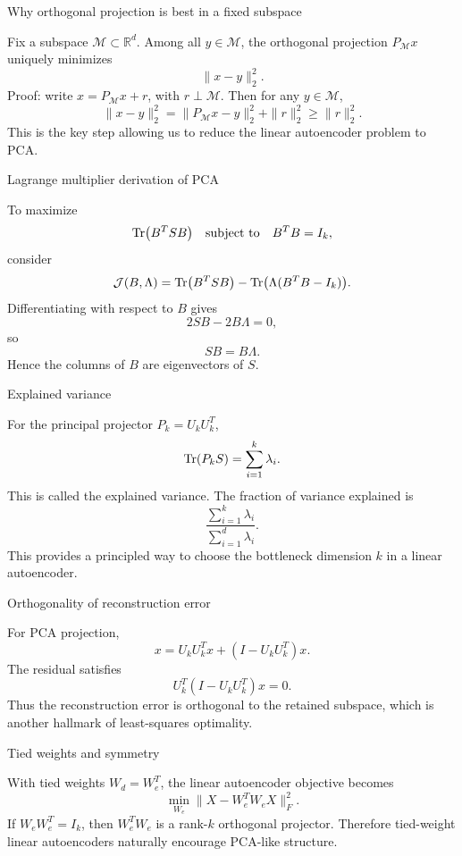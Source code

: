 \documentclass[aspectratio=169]{beamer}
\begin{document}
\begin{frame}{Why orthogonal projection is best in a fixed subspace}

Fix a subspace \(\mathcal{M}\subset \mathbb{R}^d\). Among all \(y\in \mathcal{M}\), the orthogonal projection \(P_{\mathcal{M}}x\) uniquely minimizes
\[
\|x-y\|_2^2.
\]
Proof: write \(x = P_{\mathcal{M}}x + r\), with \(r\perp \mathcal{M}\). Then for any \(y\in\mathcal{M}\),
\[
\|x-y\|_2^2
=
\|P_{\mathcal{M}}x-y\|_2^2 + \|r\|_2^2 \ge \|r\|_2^2.
\]
This is the key step allowing us to reduce the linear autoencoder problem to PCA.

\end{frame}

\begin{frame}{Lagrange multiplier derivation of PCA}

To maximize
\[
\Tr(B^TSB)
\quad \text{subject to} \quad B^TB=I_k,
\]
consider
\[
\mathcal{J}(B,\Lambda)=\Tr(B^TSB)-\Tr\bigl(\Lambda(B^TB-I_k)\bigr).
\]
Differentiating with respect to \(B\) gives
\[
2SB - 2B\Lambda = 0,
\]
so
\[
SB = B\Lambda.
\]
Hence the columns of \(B\) are eigenvectors of \(S\).

\end{frame}

\begin{frame}{Explained variance}

For the principal projector \(P_k=U_kU_k^T\),
\[
\Tr(P_k S)=\sum_{i=1}^k \lambda_i.
\]
This is called the explained variance.
The fraction of variance explained is
\[
\frac{\sum_{i=1}^k \lambda_i}{\sum_{i=1}^d \lambda_i}.
\]
This provides a principled way to choose the bottleneck dimension \(k\) in a linear autoencoder.

\end{frame}

\begin{frame}{Orthogonality of reconstruction error}

For PCA projection,
\[
x = U_kU_k^T x + (I-U_kU_k^T)x.
\]
The residual satisfies
\[
U_k^T (I-U_kU_k^T)x = 0.
\]
Thus the reconstruction error is orthogonal to the retained subspace, which is another hallmark of least-squares optimality.

\end{frame}

\begin{frame}{Tied weights and symmetry}

With tied weights \(W_d=W_e^T\), the linear autoencoder objective becomes
\[
\min_{W_e}\|X-W_e^TW_eX\|_F^2.
\]
If \(W_eW_e^T=I_k\), then \(W_e^TW_e\) is a rank-\(k\) orthogonal projector.
Therefore tied-weight linear autoencoders naturally encourage PCA-like structure.

\end{frame}
\end{document}
